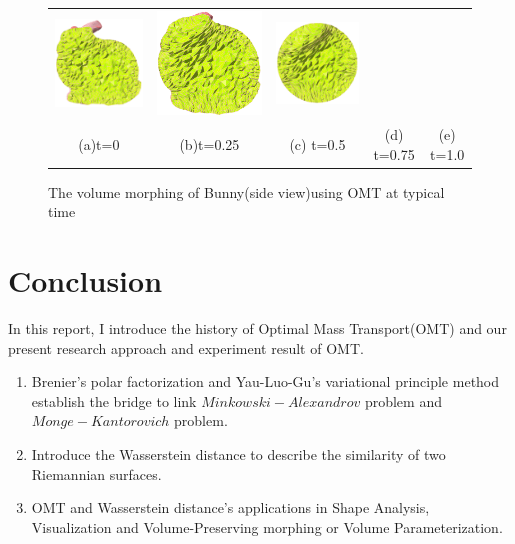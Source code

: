 \documentclass[runningheads]{llncs}
\begin{document}
{\begin{figure}[!htbp]
\begin{tabular}{ccccc}
\includegraphics[height=0.2\textwidth]{./figs/bunny_omt_morph/h.png}&
\includegraphics[height=0.2\textwidth]{./figs/bunny_omt_morph/i.png}&
\includegraphics[height=0.2\textwidth]{./figs/bunny_omt_morph/j.png}\\
(a)t=0 &(b)t=0.25 &(c) t=0.5 &(d) t=0.75 &(e) t=1.0\\
\end{tabular}
  \caption{The volume morphing of Bunny(side view)using OMT at typical time }
  \label{fig:bunny_omt_morph}
\end{figure}
}



\section{Conclusion}

In this report, I introduce the history of Optimal Mass Transport(OMT) and our present research approach and experiment result of OMT.

\begin{enumerate}

\item Brenier's polar factorization\cite{brenier1991polar} and Yau-Luo-Gu's\cite{gu2013variational} variational principle method establish the bridge to link  $ Minkowski-Alexandrov $ problem and $ Monge-Kantorovich $ problem.

\item Introduce the Wasserstein distance to describe the similarity of two Riemannian surfaces.

\item OMT and Wasserstein distance's applications in Shape Analysis, Visualization and Volume-Preserving morphing or Volume Parameterization.

\end{enumerate}
\end{document}
